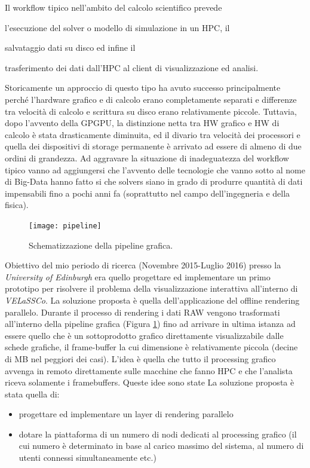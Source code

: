 \documentclass[a4paper,11pt]{paper}
\begin{document}
Il workflow tipico nell'ambito del calcolo scientifico prevede
\begin{inparadesc}
\item[l'esecuzione] del solver o modello di simulazione in un HPC, il
\item[salvataggio]  dati su disco ed infine il
\item[trasferimento] dei dati dall'HPC al client di visualizzazione ed analisi.
\end{inparadesc}
Storicamente un approccio di questo tipo ha avuto successo principalmente perché l'hardware grafico e di calcolo erano completamente separati e differenze tra velocità di calcolo e scrittura su disco erano relativamente piccole.
Tuttavia, dopo l'avvento della GPGPU, la distinzione netta tra HW grafico e
HW di calcolo è stata drasticamente diminuita, ed il divario tra velocità dei processori e quella dei dispositivi di storage permanente è arrivato ad essere di almeno di due ordini di grandezza.
Ad aggravare la situazione di inadeguatezza del workflow tipico vanno ad aggiungersi che l'avvento delle tecnologie che vanno sotto al nome di Big-Data  hanno fatto si che solvers siano in grado di produrre quantità di dati impensabili fino a pochi anni fa (soprattutto nel campo dell'ingegneria e della fisica). 

\begin{figure}
 \centering
   \texttt{[image: pipeline]}
 \caption{Schematizzazione della pipeline grafica.}
       \label{fig:pip}
 \end{figure}

Obiettivo del mio periodo di ricerca (Novembre 2015-Luglio 2016) presso la \textit{University of Edinburgh} era quello progettare ed implementare un primo prototipo per risolvere il problema della visualizzazione interattiva all'interno di \textit{VELaSSCo}. La soluzione proposta è  quella dell'applicazione del offline rendering parallelo.
Durante il processo di rendering i dati RAW vengono trasformati  all'interno della pipeline grafica (Figura \ref{fig:pip}) fino ad arrivare in ultima istanza ad essere quello che è un sottoprodotto grafico direttamente visualizzabile dalle schede grafiche, il frame-buffer la cui  dimensione è relativamente piccola (decine di MB nel peggiori dei casi).
L'idea è quella che tutto il processing grafico avvenga in remoto direttamente sulle macchine che fanno HPC e che l'analista riceva solamente i framebuffers.
Queste idee sono state
La soluzione proposta è stata quella di:
\begin{itemize}
\item progettare ed implementare un layer di rendering parallelo
\item dotare la piattaforma di un numero di nodi dedicati al processing grafico (il cui numero è determinato in base al carico massimo del sistema, al numero di utenti connessi simultaneamente etc.)

\end{itemize}
\end{document}
